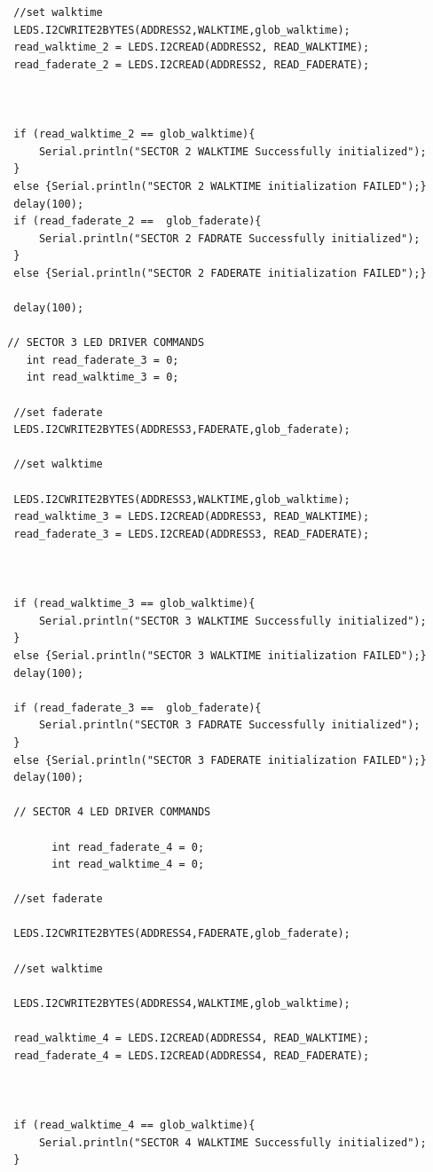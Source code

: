 \documentclass[12pt,a4paper]{report}
\begin{document}
\begin{lstlisting}
  //set walktime
  LEDS.I2CWRITE2BYTES(ADDRESS2,WALKTIME,glob_walktime);
  read_walktime_2 = LEDS.I2CREAD(ADDRESS2, READ_WALKTIME);
  read_faderate_2 = LEDS.I2CREAD(ADDRESS2, READ_FADERATE);



  if (read_walktime_2 == glob_walktime){
      Serial.println("SECTOR 2 WALKTIME Successfully initialized");
  }
  else {Serial.println("SECTOR 2 WALKTIME initialization FAILED");}
  delay(100);
  if (read_faderate_2 ==  glob_faderate){
      Serial.println("SECTOR 2 FADRATE Successfully initialized");
  }
  else {Serial.println("SECTOR 2 FADERATE initialization FAILED");} 

  delay(100);

 // SECTOR 3 LED DRIVER COMMANDS
    int read_faderate_3 = 0;
    int read_walktime_3 = 0;

  //set faderate
  LEDS.I2CWRITE2BYTES(ADDRESS3,FADERATE,glob_faderate); 

  //set walktime

  LEDS.I2CWRITE2BYTES(ADDRESS3,WALKTIME,glob_walktime);
  read_walktime_3 = LEDS.I2CREAD(ADDRESS3, READ_WALKTIME);
  read_faderate_3 = LEDS.I2CREAD(ADDRESS3, READ_FADERATE);



  if (read_walktime_3 == glob_walktime){
      Serial.println("SECTOR 3 WALKTIME Successfully initialized");
  }
  else {Serial.println("SECTOR 3 WALKTIME initialization FAILED");}
  delay(100);

  if (read_faderate_3 ==  glob_faderate){
      Serial.println("SECTOR 3 FADRATE Successfully initialized");
  }
  else {Serial.println("SECTOR 3 FADERATE initialization FAILED");}  
  delay(100);

  // SECTOR 4 LED DRIVER COMMANDS

		int read_faderate_4 = 0;
		int read_walktime_4 = 0;

  //set faderate

  LEDS.I2CWRITE2BYTES(ADDRESS4,FADERATE,glob_faderate); 

  //set walktime

  LEDS.I2CWRITE2BYTES(ADDRESS4,WALKTIME,glob_walktime);
		
  read_walktime_4 = LEDS.I2CREAD(ADDRESS4, READ_WALKTIME);
  read_faderate_4 = LEDS.I2CREAD(ADDRESS4, READ_FADERATE);



  if (read_walktime_4 == glob_walktime){
      Serial.println("SECTOR 4 WALKTIME Successfully initialized");
  }


\end{lstlisting}
\end{document}
